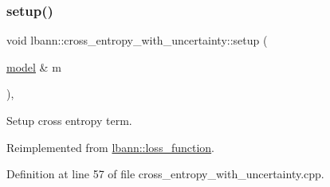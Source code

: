 \subsubsection{\texorpdfstring{setup()}{setup()}}
{\footnotesize\ttfamily void lbann\+::cross\+\_\+entropy\+\_\+with\+\_\+uncertainty\+::setup (\begin{DoxyParamCaption}\item[{\hyperlink{classlbann_1_1model}{model} \&}]{m }\end{DoxyParamCaption})\hspace{0.3cm}{\ttfamily [override]}, {\ttfamily [virtual]}}

Setup cross entropy term. 

Reimplemented from \hyperlink{classlbann_1_1loss__function_a17a3629e8519c4215ad776a0c7b522ae}{lbann\+::loss\+\_\+function}.



Definition at line 57 of file cross\+\_\+entropy\+\_\+with\+\_\+uncertainty.\+cpp.


